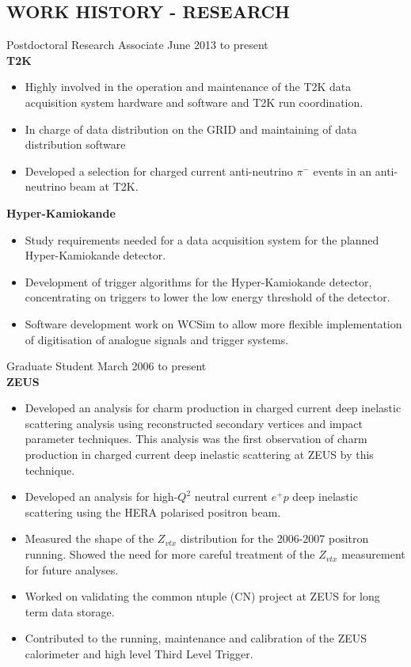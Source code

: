 \documentclass[margin]{res}
\begin{document}
\begin{resume}
\section{WORK HISTORY - RESEARCH}
Postdoctoral Research Associate \hfill June 2013 to present\\
\textbf{T2K}
\begin{itemize}
\item Highly involved in the operation and maintenance of the T2K data acquisition system hardware and software and T2K run coordination.
\item In charge of data distribution on the GRID and maintaining of data distribution software
\item Developed a selection for charged current anti-neutrino $\pi^{-}$ events in an anti-neutrino beam at T2K.
\end{itemize}
\textbf{Hyper-Kamiokande}
\begin{itemize}
\item Study requirements needed for a data acquisition system for the planned Hyper-Kamiokande detector.
\item Development of trigger algorithms for the Hyper-Kamiokande detector, concentrating on triggers to lower the low energy threshold of the detector.
\item Software development work on WCSim to allow more flexible implementation of digitisation of analogue signals and trigger systems.
\end{itemize}
Graduate Student \hfill March 2006 to present\\
\textbf{ZEUS}
\begin{itemize}
\item Developed an analysis for charm production in charged current deep inelastic scattering analysis using reconstructed secondary vertices and impact parameter techniques.  This analysis was the first observation of charm production in charged current deep inelastic scattering at ZEUS by this technique.
\item Developed an analysis for high-$Q^2$ neutral current $e^{+}p $ deep inelastic scattering using the HERA polarised positron beam. 
\item Measured the shape of the $Z_{vtx}$ distribution for the 2006-2007 positron running.  Showed the need for more careful treatment of the $Z_{vtx}$ measurement for future analyses.
\item Worked on validating the common ntuple (CN) project at ZEUS for long term data storage.
\item Contributed to the running, maintenance and calibration of the ZEUS calorimeter and high level Third Level Trigger. 

\end{itemize}
\end{resume}
\end{document}
